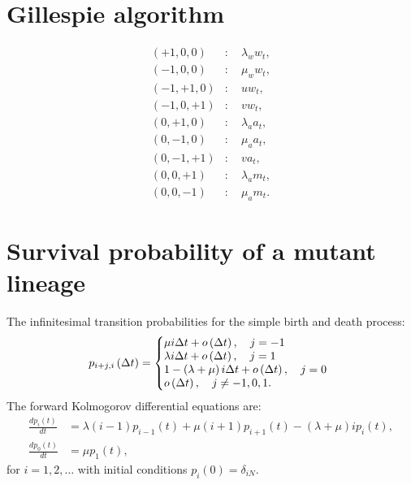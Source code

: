 \documentclass[12pt]{extarticle}
\begin{document}
\begin{appendices}
\renewcommand{\theequation}{\thesection\arabic{equation}}


\section*{Gillespie algorithm}
\begin{subequations}
\begin{flalign}
(+1,0,0)&:\quad \lambda_ww_t,\\
(-1,0,0)&:\quad \mu_ww_t,\\
(-1,+1,0)&:\quad uw_t,\\
(-1,0,+1)&:\quad vw_t,\\
(0,+1,0)&:\quad \lambda_aa_t,\\
(0,-1,0)&:\quad \mu_aa_t,\\
(0,-1,+1)&:\quad va_t,\\
(0,0,+1)&:\quad \lambda_am_t,\\
(0,0,-1)&:\quad \mu_am_t.
\end{flalign}
\end{subequations}

\section*{Survival probability of a mutant lineage}\label{AppendixSurvLin}
The infinitesimal transition probabilities for the simple birth and death process:
\begin{align*}
p_{i+j,i}\left(\Delta t\right)=\left\{
  \begin{array}{@{}ll@{}}
  \mu i\Delta t+o\left(\Delta t\right),\quad j=-1 \\
  \lambda i\Delta t+o\left(\Delta t\right),\quad j=1 \\
    1-\left(\lambda+\mu\right) i\Delta t+o\left(\Delta t\right),\quad j=0 \\
   o\left(\Delta t\right),\quad j\neq-1,0,1.
  \end{array}\right.
\end{align*}
The forward Kolmogorov differential equations are:
\begin{subequations}
\label{KolmeqSurv}
\begin{flalign}
\frac{dp_i\left(t\right)}{dt}&=\lambda\left(i-1\right)p_{i-1}\left(t\right)+\mu\left(i+1\right)p_{i+1}\left(t\right)-\left(\lambda+\mu\right)ip_i\left(t\right),\\
\frac{dp_0\left(t\right)}{dt}&=\mu p_1\left(t\right),
\end{flalign}
\end{subequations}
for $i=1,2,\dots$ with initial conditions $p_i\left(0\right)=\delta_{iN}$.


\end{appendices}
\end{document}
